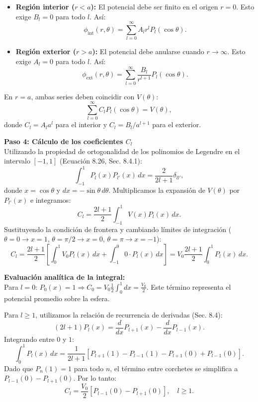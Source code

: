 \documentclass[a4paper]{article}
\begin{document}
\begin{itemize}
    \item \textbf{Región interior ($r < a$):} El potencial debe ser finito en el origen $r=0$. Esto exige $B_l = 0$ para todo $l$. Así:
    $$
    \phi_{\text{int}}(r, \theta) = \sum_{l=0}^{\infty} A_l r^l P_l(\cos\theta).
    $$
    \item \textbf{Región exterior ($r > a$):} El potencial debe anularse cuando $r \to \infty$. Esto exige $A_l = 0$ para todo $l$. Así:
    $$
    \phi_{\text{ext}}(r, \theta) = \sum_{l=0}^{\infty} \frac{B_l}{r^{l+1}} P_l(\cos\theta).
    $$
\end{itemize}
En $r=a$, ambas series deben coincidir con $V(\theta)$:
$$
\sum_{l=0}^{\infty} C_l P_l(\cos\theta) = V(\theta),
$$
donde $C_l = A_l a^l$ para el interior y $C_l = B_l / a^{l+1}$ para el exterior.

\vspace{0.3cm}
\noindent\textbf{Paso 4: Cálculo de los coeficientes $C_l$}\\
Utilizando la propiedad de ortogonalidad de los polinomios de Legendre en el intervalo $[-1, 1]$ (Ecuación 8.26, Sec. 8.4.1):
$$
\int_{-1}^{1} P_l(x) P_{l'}(x) \, dx = \frac{2}{2l+1} \delta_{ll'},
$$
donde $x = \cos\theta$ y $dx = -\sin\theta \, d\theta$. Multiplicamos la expansión de $V(\theta)$ por $P_{l'}(x)$ e integramos:
$$
C_l = \frac{2l+1}{2} \int_{-1}^{1} V(x) P_l(x) \, dx.
$$
Sustituyendo la condición de frontera y cambiando límites de integración ($\theta=0 \to x=1$, $\theta=\pi/2 \to x=0$, $\theta=\pi \to x=-1$):
$$
C_l = \frac{2l+1}{2} \left[ \int_{0}^{1} V_0 P_l(x) \, dx + \int_{-1}^{0} 0 \cdot P_l(x) \, dx \right] = V_0 \frac{2l+1}{2} \int_{0}^{1} P_l(x) \, dx.
$$

\noindent\textbf{Evaluación analítica de la integral:}\\
Para $l=0$: $P_0(x)=1 \Rightarrow C_0 = V_0 \frac{1}{2} \int_0^1 dx = \frac{V_0}{2}$. Este término representa el potencial promedio sobre la esfera.

Para $l \geq 1$, utilizamos la relación de recurrencia de derivadas (Sec. 8.4):
$$
(2l+1)P_l(x) = \frac{d}{dx}P_{l+1}(x) - \frac{d}{dx}P_{l-1}(x).
$$
Integrando entre $0$ y $1$:
$$
\int_{0}^{1} P_l(x) \, dx = \frac{1}{2l+1} \left[ P_{l+1}(1) - P_{l-1}(1) - P_{l+1}(0) + P_{l-1}(0) \right].
$$
Dado que $P_n(1) = 1$ para todo $n$, el término entre corchetes se simplifica a $P_{l-1}(0) - P_{l+1}(0)$. Por lo tanto:
$$
C_l = \frac{V_0}{2} \left[ P_{l-1}(0) - P_{l+1}(0) \right], \quad l \geq 1.
$$
\end{document}
